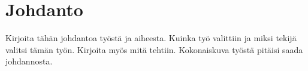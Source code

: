 \chapter{Johdanto}
\label{ch:johdanto}
\begin{it}
	Kirjoita tähän johdantoa työstä ja aiheesta. Kuinka työ valittiin ja miksi tekijä valitsi tämän työn. Kirjoita myös mitä tehtiin. Kokonaiskuva työstä pitäisi saada johdannosta.
\end{it}